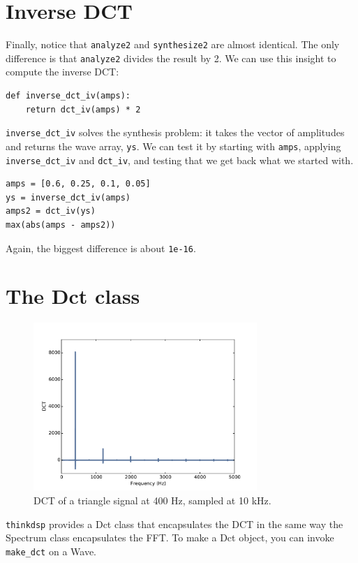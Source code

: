 \documentclass[12pt]{book}
\begin{document}
\section{Inverse DCT}

Finally, notice that {\tt analyze2} and {\tt synthesize2} are almost
identical.  The only difference is that {\tt analyze2} divides the
result by 2.  We can use this insight to compute the inverse DCT:

\begin{verbatim}
def inverse_dct_iv(amps):
    return dct_iv(amps) * 2
\end{verbatim}

\verb"inverse_dct_iv" solves the synthesis problem: it
takes the vector of amplitudes and returns
the wave array, {\tt ys}.  We can test it by starting
with {\tt amps}, applying \verb"inverse_dct_iv" and \verb"dct_iv",
and testing that we get back what we started with.

\begin{verbatim}
amps = [0.6, 0.25, 0.1, 0.05]
ys = inverse_dct_iv(amps)
amps2 = dct_iv(ys)
max(abs(amps - amps2))
\end{verbatim}

Again, the biggest difference is about {\tt 1e-16}.


\section{The Dct class}

\begin{figure}
\centerline{\includegraphics[height=2.5in]{figs/dct1.pdf}}
\caption{DCT of a triangle signal at 400 Hz, sampled at 10 kHz.}
\label{fig.dct1}
\end{figure}

{\tt thinkdsp} provides a Dct class that encapsulates the
DCT in the same way the Spectrum class encapsulates the FFT.
To make a Dct object, you can invoke \verb"make_dct" on a Wave.
\end{document}
